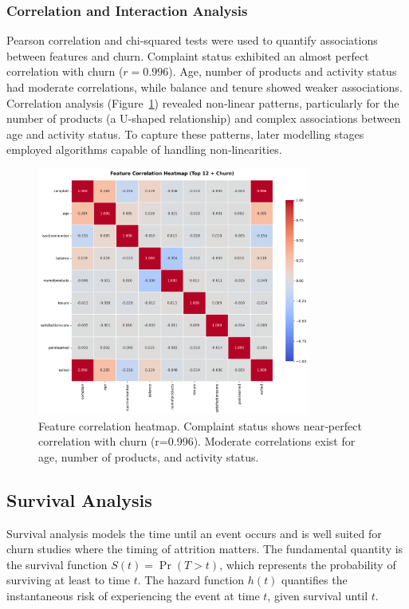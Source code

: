 \documentclass[12pt]{article}
\begin{document}
\subsubsection{Correlation and Interaction Analysis}
Pearson correlation and chi‑squared tests were used to quantify associations between features and churn.  Complaint status exhibited an almost perfect correlation with churn (\(r=0.996\)).  Age, number of products and activity status had moderate correlations, while balance and tenure showed weaker associations.  Correlation analysis (Figure~\ref{fig:correlation}) revealed non‑linear patterns, particularly for the number of products (a U‑shaped relationship) and complex associations between age and activity status.  To capture these patterns, later modelling stages employed algorithms capable of handling non‑linearities.

\begin{figure}[H]
\centering
\includegraphics[width=0.8\textwidth]{img/08_correlation_heatmap.png}
\caption{Feature correlation heatmap. Complaint status shows near‑perfect correlation with churn (r=0.996). Moderate correlations exist for age, number of products, and activity status.}
\label{fig:correlation}
\end{figure}

\subsection{Survival Analysis}
Survival analysis models the time until an event occurs and is well suited for churn studies where the timing of attrition matters.  The fundamental quantity is the survival function \(S(t) = \Pr(T > t)\), which represents the probability of surviving at least to time \(t\).  The hazard function \(h(t)\) quantifies the instantaneous risk of experiencing the event at time \(t\), given survival until \(t\).
\end{document}
